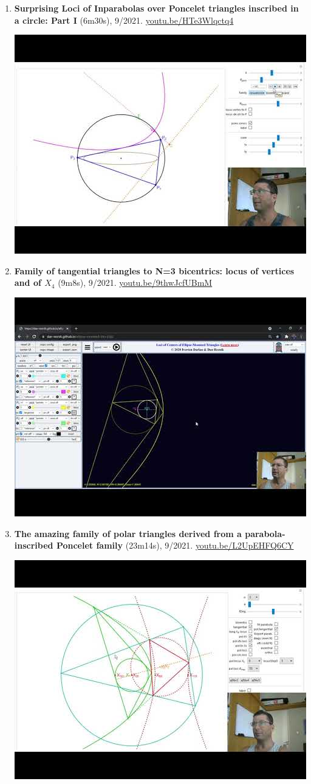\documentclass[12pt]{article}
\begin{document}
\begin{enumerate}[resume]
\item \textbf{Surprising Loci of Inparabolas over Poncelet triangles inscribed in a circle: Part I} (6m30s), 9/2021. \href{https://youtu.be/HTe3Wlqctq4}{\url{youtu.be/HTe3Wlqctq4}}
\begin{center}\includegraphics[width=.5\textwidth]{pics/HTe3Wlqctq4.jpg}\end{center}
% 
\item \textbf{Family of tangential triangles to N=3 bicentrics: locus of vertices and of $X_{4}$} (9m8s), 9/2021. \href{https://youtu.be/9thwJcfUBmM}{\url{youtu.be/9thwJcfUBmM}}
\begin{center}\includegraphics[width=.5\textwidth]{pics/9thwJcfUBmM.jpg}\end{center}
% 
\item \textbf{The amazing family of polar triangles derived from a parabola-inscribed Poncelet family} (23m14s), 9/2021. \href{https://youtu.be/L2UpEHFQ6CY}{\url{youtu.be/L2UpEHFQ6CY}}
\begin{center}\includegraphics[width=.5\textwidth]{pics/L2UpEHFQ6CY.jpg}\end{center}

\end{enumerate}
\end{document}
